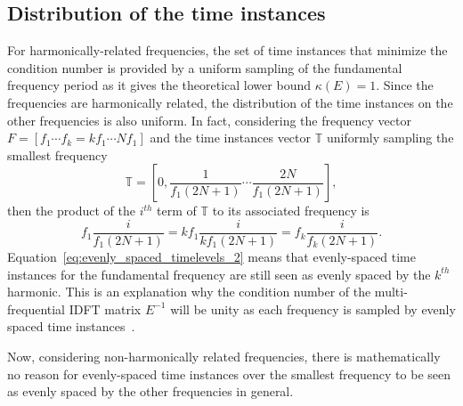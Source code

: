 \subsection{Distribution of the time instances}
For harmonically-related frequencies, the set of time instances
that minimize the condition number is 
provided by a uniform sampling of the fundamental frequency period
as it gives the theoretical lower bound $\kappa (E) = 1$. Since the
frequencies are harmonically related, the distribution of the time
instances on the other frequencies is also uniform. 
In fact, considering the
frequency vector $F = \left[f_1 \cdots f_k= kf_1 \cdots Nf_1 \right]$
and the time instances vector
$\mathbb{T}$ uniformly sampling the smallest frequency
\begin{equation}
  \mathbb{T} = \left[0, \frac{1}{f_1 (2N+1)} \cdots  \frac{2N}{f_1 (2N+1)} \right],
  \label{eq:evenly_spaced_timelevels}
\end{equation}
then the product of the $i^{th}$ term of $\mathbb{T}$ to its
associated frequency is
\begin{equation}
  f_1 \frac{i}{f_1 (2N+1)} = k f_1 \frac{i}{k f_1 (2N+1)} = f_k \frac{i}{f_k (2N+1)}.
  \label{eq:evenly_spaced_timelevels_2}
\end{equation}
Equation~\eqref{eq:evenly_spaced_timelevels_2} means that evenly-spaced
time instances for the fundamental frequency are still seen as evenly
spaced by the $k^{th}$ harmonic. This is an explanation why the
condition number of the multi-frequential IDFT matrix $E^{-1}$ will be
unity as each frequency is sampled by evenly spaced time
instances~\cite{Brambilla1999}.

Now, considering non-harmonically related frequencies, there is
mathematically no reason for evenly-spaced time instances over the
smallest frequency to be seen as evenly spaced by the other frequencies
in general.

